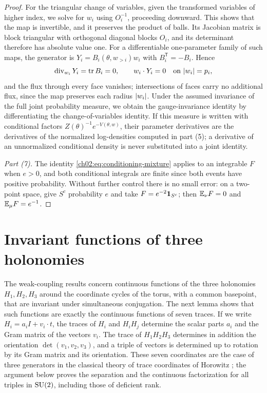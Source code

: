 \begin{proof}
For the triangular change of variables, given the transformed variables of higher index, we solve for $w_i$ using $O_i^{-1}$, proceeding downward. This shows that the map is invertible, and it preserves the product of balls. Its Jacobian matrix is block triangular with orthogonal diagonal blocks $O_i$, and its determinant therefore has absolute value one. For a differentiable one-parameter family of such maps, the generator is $Y_i=B_i(\theta,w_{>i})w_i$ with $B_i^{\mathsf T}=-B_i$. Hence
\[
 \operatorname{div}_{w_i}Y_i=\operatorname{tr} B_i=0,\qquad w_i\cdot Y_i=0\quad\text{on }\lvert w_i\rvert=p_i,
\]
and the flux through every face vanishes; intersections of faces carry no additional flux, since the map preserves each radius $\lvert w_i\rvert$. Under the assumed invariance of the full joint probability measure, we obtain the gauge-invariance identity by differentiating the change-of-variables identity. If this measure is written with conditional factors $Z(\theta)^{-1}e^{-V(\theta,w)}$, their parameter derivatives are the derivatives of the normalized log-densities computed in part (5); a derivative of an unnormalized conditional density is never substituted into a joint identity.

\emph{Part (7).} The identity \eqref{ch02:eq:conditioning-mixture} applies to an integrable $F$ when $e>0$, and both conditional integrals are finite since both events have positive probability. Without further control there is no small error: on a two-point space, give $S^c$ probability $e$ and take $F=e^{-2}\mathbf 1_{S^c}$; then $\mathbb E_\nu F=0$ and $\mathbb E_\mu F=e^{-1}$.
\end{proof}

\section{Invariant functions of three holonomies}\label{ch02:sec:traces}

The weak-coupling results concern continuous functions of the three holonomies $H_1,H_2,H_3$ around the coordinate cycles of the torus, with a common basepoint, that are invariant under simultaneous conjugation. The next lemma shows that such functions are exactly the continuous functions of seven traces. If we write $H_i=a_iI+v_i\cdot t$, the traces of $H_i$ and $H_iH_j$ determine the scalar parts $a_i$ and the Gram matrix of the vectors $v_i$. The trace of $H_1H_2H_3$ determines in addition the orientation $\det(v_1,v_2,v_3)$, and a triple of vectors is determined up to rotation by its Gram matrix and its orientation. These seven coordinates are the case of three generators in the classical theory of trace coordinates of Horowitz \cite{Horowitz1972Characters}; the argument below proves the separation and the continuous factorization for all triples in $\mathrm{SU}(2)$, including those of deficient rank.

